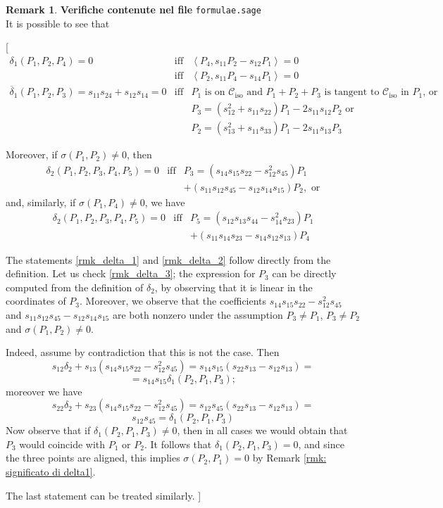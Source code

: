 \documentclass{amsart}
\theoremstyle{plain}
\theoremstyle{definition}
\newtheorem{rmk}[lemma]{Remark}
\newcommand{\iso}{\mathcal{C}_{\mathrm{iso}}}
\newcommand{\scl}[2]{\left\langle {#1}, {#2} \right\rangle}
\newcommand{\blue}[1]{{\color{blue}  [#1]}}
\begin{document}
\begin{rmk}
\label{rmk:characteristics_d1_d2}
\textbf{Verifiche contenute nel file} \verb+formulae.sage+ \\
It is possible to see that
\blue{
\begin{eqnarray}
\label{rmk_delta_1}
\delta_1(P_1, P_2, P_4) =0  &\mbox{iff} &\scl{P_4}{s_{11}P_2-s_{12}P_1} = 0\\
&\mbox{iff} &\scl{P_2}{s_{11}P_4-s_{14}P_1} = 0\\
\label{rmk_delta_2}
\overline{\delta}_1(P_1, P_2, P_3) = s_{11} s_{24}+s_{12}s_{14}=0 &\mbox{iff}&
P_1 \mbox{ is on~$\iso$ and } P_1 + P_2 + P_3 \mbox{ is tangent to~$\iso$ in $P_1$, or} \\
&& P_3 = (s_{12}^2+s_{11}s_{22})P_1-2s_{11}s_{12}P_2 \mbox{ or} \nonumber \\
&& P_2 = (s_{13}^2+s_{11}s_{33})P_1-2s_{11}s_{13}P_3 \nonumber
\end{eqnarray}

Moreover, if $\sigma (P_1,P_2)\neq 0$, then
\begin{eqnarray}
\label{rmk_delta_3}
\delta_2(P_1, P_2, P_3, P_4, P_5) =0 & \mbox{iff}
&P_3 = (s_{14}s_{15}s_{22}-s_{12}^2s_{45})P_1 \nonumber \\
&& +(s_{11}s_{12}s_{45}-s_{12}s_{14}s_{15})P_2,\mbox{ or}
\end{eqnarray}
and, similarly, if $\sigma (P_1,P_4) \neq 0$, we have
\begin{eqnarray}
\delta_2(P_1, P_2, P_3, P_4, P_5)=0& \mbox{iff}
&
P_5 = (s_{12}s_{13}s_{44}-s_{14}^2s_{23})P_1  \\
&& +(s_{11}s_{14}s_{23}-s_{14}s_{12}s_{13})P_4 \nonumber
\end{eqnarray}

The statements \ref{rmk_delta_1} and \ref{rmk_delta_2} follow directly from the definition. Let us check \ref{rmk_delta_3}; the expression for $P_3$ can be directly computed from the definition of $\delta_2$, by observing that it is linear in the coordinates of $P_3$. Moreover, we observe that the coefficients
$s_{14}s_{15}s_{22}-s_{12}^2s_{45}$ and $s_{11}s_{12}s_{45}-s_{12}s_{14}s_{15}$
are both nonzero under the assumption $P_3 \neq P_1$, $P_3 \neq P_2$ and $\sigma(P_1,P_2) \neq 0$.

Indeed, assume by contradiction that this is not the case. Then
$$
s_{12} \delta_2 +s_{13} (s_{14}s_{15}s_{22}-s_{12}^2s_{45})=s_{14} s_{15}(s_{22}s_{13}- s_{12} s_{13})=
$$
$$
=s_{14} s_{15} \delta_1 (P_2,P_1,P_3);
$$
moreover we have
$$
s_{22} \delta_2 +s_{23}(s_{14}s_{15}s_{22}-s_{12}^2s_{45})=s_{12} s_{45}
(s_{22}s_{13}- s_{12} s_{13})=
$$
$$
s_{12} s_{45}=\delta_1 (P_2,P_1,P_3)
$$
Now observe that if $\delta_1(P_2,P_1,P_3) \neq 0$, then in all cases we would obtain that $P_3$ would coincide with $P_1$ or $P_2$. It follows that $\delta_1(P_2,P_1,P_3)=0$, and since the three points are aligned, this implies $\sigma (P_2,P_1)=0$ by Remark \ref{rmk: significato di delta1}.

The last statement can be treated similarly.
}
\end{rmk}
\end{document}
